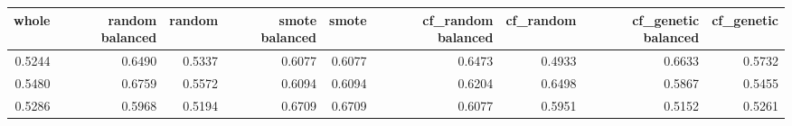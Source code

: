 \begin{tabular}{rrrrrrrrr}
\toprule

 whole &  random balanced &  random &  smote balanced &  smote &  cf\_random balanced &  cf\_random &  cf\_genetic balanced &  cf\_genetic \\
\midrule

0.5244 &           0.6490 &  0.5337 &          0.6077 & 0.6077 &              0.6473 &     0.4933 &               0.6633 &      0.5732 \\
0.5480 &           0.6759 &  0.5572 &          0.6094 & 0.6094 &              0.6204 &     0.6498 &               0.5867 &      0.5455 \\
0.5286 &           0.5968 &  0.5194 &          0.6709 & 0.6709 &              0.6077 &     0.5951 &               0.5152 &      0.5261 \\

\bottomrule
\end{tabular}
